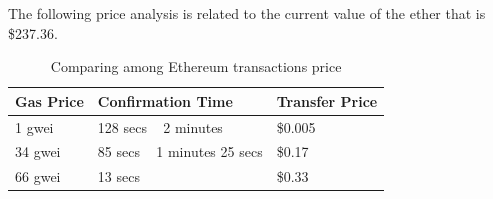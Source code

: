 The following price analysis is related to the current value of the ether that is \$237.36.\cite{gastracker} \cite{ethgasstation}

\begin{table}[h]
    {\renewcommand\arraystretch{1.25}
    \begin{tabular}{|l|l|l|} \hline
    \textbf{Gas Price} & \textbf{Confirmation Time} & \textbf{Transfer Price}\\ \hline\hline
    1 gwei & 128 secs ~ 2 minutes & \$0.005 \\ \hline
    34 gwei & 85 secs ~ 1 minutes 25 secs & \$0.17\\ \hline
    66 gwei & 13 secs & \$0.33\\ \hline
    \end{tabular}}
    \caption{Comparing among Ethereum transactions price}
    \label{table-compare-eth-price}
\end{table}